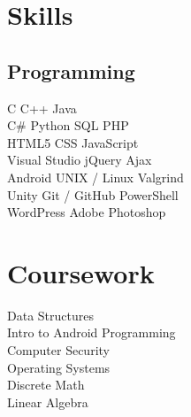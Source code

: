 \documentclass[letterpaper]{deedy-resume} %
\newcommand{\CS}{C\#}
\begin{document}
\begin{minipage}[t]{0.33\textwidth}
\sectionspace %


\section{Skills}

\subsection{Programming}

C \textbullet{} C++ \textbullet{} Java \\
\CS{} \textbullet{} Python \textbullet{} SQL \textbullet{} PHP \\
HTML5 \textbullet{} CSS \textbullet{} JavaScript \\
Visual Studio \textbullet{} jQuery \textbullet{} Ajax \\
Android \textbullet{} UNIX / Linux \textbullet{} Valgrind \\
Unity \textbullet{} Git / GitHub \textbullet{} PowerShell \\
WordPress \textbullet{} Adobe Photoshop

\sectionspace %



\section{Coursework}

Data Structures \\
Intro to Android Programming \\
Computer Security \\
Operating Systems \\
Discrete Math \\
Linear Algebra

\sectionspace %



\end{minipage}
\end{document}
